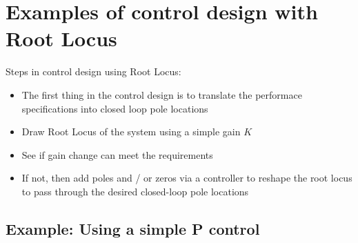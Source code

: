 \section{Examples of control design with Root Locus}

Steps in control design using Root Locus:
\begin{itemize}
	\item The first thing in the control design is to translate the performace specifications into closed loop pole locations
	\item Draw Root Locus of the system using a simple gain $K$
	\item See if gain change can meet the requirements
	\item If not, then add poles and / or zeros via a controller to reshape the root locus to pass through the desired closed-loop pole locations
\end{itemize}

\subsection{Example: Using a simple P control}

